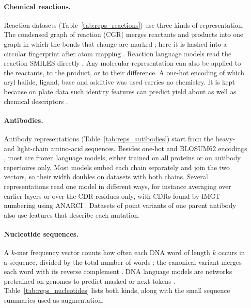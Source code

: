 \paragraph{Chemical reactions.} Reaction datasets (Table~\ref{tab:reps_reactions}) use three kinds of representation. The condensed graph of reaction (CGR) merges reactants and products into one graph in which the bonds that change are marked \citep{Hoonakker2011}; here it is hashed into a circular fingerprint after atom mapping \citep{Schwaller2021rxnmapper}. Reaction language models read the reaction SMILES directly \citep{Schwaller2021rxnfp, Sagawa2023ReactionT5}. Any molecular representation can also be applied to the reactants, to the product, or to their difference. A one-hot encoding of which aryl halide, ligand, base and additive was used carries no chemistry. It is kept because on plate data such identity features can predict yield about as well as chemical descriptors \citep{Chuang2018}.

\paragraph{Antibodies.} Antibody representations (Table~\ref{tab:reps_antibodies}) start from the heavy- and light-chain amino-acid sequences. Besides one-hot and BLOSUM62 encodings \citep{Henikoff1992}, most are frozen language models, either trained on all proteins or on antibody repertoires only. Most models embed each chain separately and join the two vectors, so their width doubles on datasets with both chains. Several representations read one model in different ways, for instance averaging over earlier layers or over the CDR residues only, with CDRs found by IMGT numbering \citep{Lefranc2003} using ANARCI \citep{Dunbar2016ANARCI}. Datasets of point variants of one parent antibody also use features that describe each mutation.

\paragraph{Nucleotide sequences.} A $k$-mer frequency vector counts how often each DNA word of length $k$ occurs in a sequence, divided by the total number of words \citep{Vinga2003}; the canonical variant merges each word with its reverse complement \citep{Teeling2004}. DNA language models are networks pretrained on genomes to predict masked or next tokens \citep{Zhou2023DNABERT2, DallaTorre2025, Nguyen2023HyenaDNA}. Table~\ref{tab:reps_nucleotides} lists both kinds, along with the small sequence summaries used as augmentation.

